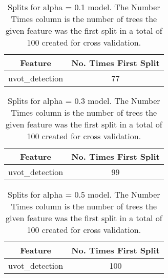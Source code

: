 \begin{table}[H]
\begin{center}
\begin{tabular}{cc}
  \hline
Feature & No. Times First Split \\ 
  \hline
uvot\_detection & 77 \\ 
   \hline
\end{tabular}
\caption{Splits for alpha = 0.1 model. The Number Times column is the number of trees the given feature was the first split in a total of 100 created for cross validation.}
\end{center}
\end{table}
\begin{table}[H]
\begin{center}
\begin{tabular}{cc}
  \hline
Feature & No. Times First Split \\ 
  \hline
uvot\_detection & 99 \\ 
   \hline
\end{tabular}
\caption{Splits for alpha = 0.3 model. The Number Times column is the number of trees the given feature was the first split in a total of 100 created for cross validation.}
\end{center}
\end{table}
\begin{table}[H]
\begin{center}
\begin{tabular}{cc}
  \hline
Feature & No. Times First Split \\ 
  \hline
uvot\_detection & 100 \\ 
   \hline
\end{tabular}
\caption{Splits for alpha = 0.5 model. The Number Times column is the number of trees the given feature was the first split in a total of 100 created for cross validation.}
\end{center}
\end{table}
